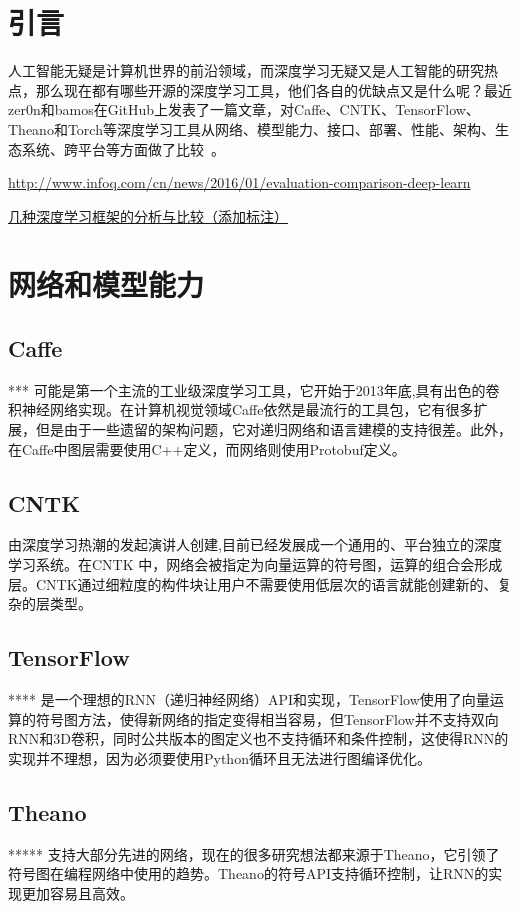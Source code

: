 \section*{引言}
人工智能无疑是计算机世界的前沿领域，而深度学习无疑又是人工智能的研究热点，那么现在都有哪些开源的深度学习工具，他们各自的优缺点又是什么呢？最近zer0n和bamos在GitHub上发表了一篇文章，对Caffe、CNTK、TensorFlow、Theano和Torch等深度学习工具从网络、模型能力、接口、部署、性能、架构、生态系统、跨平台等方面做了比较~\cite{深度学习框架的评估与比较_孙镜涛}。

\url{http://www.infoq.com/cn/news/2016/01/evaluation-comparison-deep-learn}%

\href{http://blog.csdn.net/liccv/article/details/52526506}{几种深度学习框架的分析与比较（添加标注）}%


\section{网络和模型能力}
\subsection{Caffe}
***
可能是第一个主流的工业级深度学习工具，它开始于2013年底,具有出色的卷积神经网络实现。在计算机视觉领域Caffe依然是最流行的工具包，它有很多扩展，但是由于一些遗留的架构问题，它对递归网络和语言建模的支持很差。此外，在Caffe中图层需要使用C++定义，而网络则使用Protobuf定义。

\subsection{CNTK}
由深度学习热潮的发起演讲人创建,目前已经发展成一个通用的、平台独立的深度学习系统。在CNTK 中，网络会被指定为向量运算的符号图，运算的组合会形成层。CNTK通过细粒度的构件块让用户不需要使用低层次的语言就能创建新的、复杂的层类型。

\subsection{TensorFlow}
****
是一个理想的RNN（递归神经网络）API和实现，TensorFlow使用了向量运算的符号图方法，使得新网络的指定变得相当容易，但TensorFlow并不支持双向RNN和3D卷积，同时公共版本的图定义也不支持循环和条件控制，这使得RNN的实现并不理想，因为必须要使用Python循环且无法进行图编译优化。

\subsection{Theano}
*****
支持大部分先进的网络，现在的很多研究想法都来源于Theano，它引领了符号图在编程网络中使用的趋势。Theano的符号API支持循环控制，让RNN的实现更加容易且高效。

